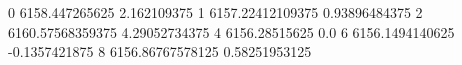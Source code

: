 0 6158.447265625 2.162109375
1 6157.22412109375 0.93896484375
2 6160.57568359375 4.29052734375
4 6156.28515625 0.0
6 6156.1494140625 -0.1357421875
8 6156.86767578125 0.58251953125
